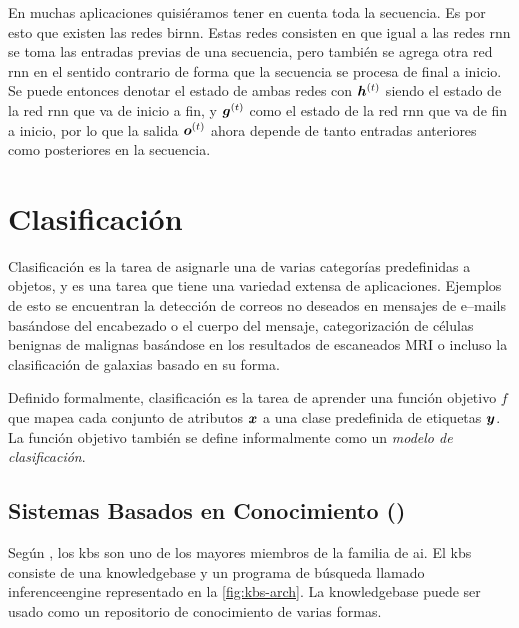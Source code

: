 En muchas aplicaciones quisiéramos tener en cuenta toda la secuencia. Es por esto que existen las redes \gls{birnn}. Estas redes consisten en que igual a las redes \gls{rnn} se toma las entradas previas de una secuencia, pero también se agrega otra red \gls{rnn} en el sentido contrario de forma que la secuencia se procesa de final a inicio. Se puede entonces denotar el estado de ambas redes con ${\bm{h}}^{(t)}$ siendo el estado de la red \gls{rnn} que va de inicio a fin, y ${\bm{g}}^{(t)}$ como el estado de la red \gls{rnn} que va de fin a inicio, por lo que la salida ${\bm{o}}^{(t)}$ ahora depende de tanto entradas anteriores como posteriores en la secuencia.


\section{Clasificación} \label{subsec:clasification}
Clasificación es la tarea de asignarle una de varias categorías predefinidas a objetos, y es una tarea que tiene una variedad extensa de aplicaciones. Ejemplos de esto se encuentran la detección de correos no deseados en mensajes de e--mails basándose del encabezado o el cuerpo del mensaje, categorización de células benignas de malignas basándose en los resultados de escaneados MRI o incluso la clasificación de galaxias basado en su forma.

Definido formalmente, clasificación es la tarea de aprender una función objetivo $f$ que mapea cada conjunto de atributos ${\bm{x}}$ a una clase predefinida de etiquetas ${\bm{y}}$. La función objetivo también se define informalmente como un \emph{modelo de clasificación}.


\subsection{Sistemas Basados en Conocimiento ()} \label{sec:KBS}
Según \cite{sajja2010knowledge}, los \gls{kbs} son uno de los mayores miembros de la familia de \gls{ai}. El \gls{kbs} consiste de una \gls{knowledgebase} y un programa de búsqueda llamado \gls{inferenceengine} representado en la \cref{fig:kbs-arch}. La \gls{knowledgebase} puede ser usado como un repositorio de conocimiento de varias formas.

